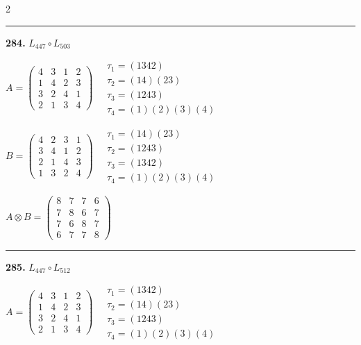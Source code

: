 \begin{multicols}{2}
\vspace{0.3em}
\hrule
\vspace{0.3em}

\noindent\textbf{284.} $L_{447} \circ L_{503}$

$A = \begin{pmatrix} 4 & 3 & 1 & 2 \\ 1 & 4 & 2 & 3 \\ 3 & 2 & 4 & 1 \\ 2 & 1 & 3 & 4 \end{pmatrix} \quad \begin{matrix} \tau_{1}=(1 3 4 2) \\ \tau_{2}=(1 4)(2 3) \\ \tau_{3}=(1 2 4 3) \\ \tau_{4}=(1)(2)(3)(4) \end{matrix}$

$B = \begin{pmatrix} 4 & 2 & 3 & 1 \\ 3 & 4 & 1 & 2 \\ 2 & 1 & 4 & 3 \\ 1 & 3 & 2 & 4 \end{pmatrix} \quad \begin{matrix} \tau_{1}=(1 4)(2 3) \\ \tau_{2}=(1 2 4 3) \\ \tau_{3}=(1 3 4 2) \\ \tau_{4}=(1)(2)(3)(4) \end{matrix}$

$A \otimes B = \begin{pmatrix} 8 & 7 & 7 & 6 \\ 7 & 8 & 6 & 7 \\ 7 & 6 & 8 & 7 \\ 6 & 7 & 7 & 8 \end{pmatrix}$

\vspace{0.3em}
\hrule
\vspace{0.3em}

\noindent\textbf{285.} $L_{447} \circ L_{512}$

$A = \begin{pmatrix} 4 & 3 & 1 & 2 \\ 1 & 4 & 2 & 3 \\ 3 & 2 & 4 & 1 \\ 2 & 1 & 3 & 4 \end{pmatrix} \quad \begin{matrix} \tau_{1}=(1 3 4 2) \\ \tau_{2}=(1 4)(2 3) \\ \tau_{3}=(1 2 4 3) \\ \tau_{4}=(1)(2)(3)(4) \end{matrix}$


\end{multicols}
